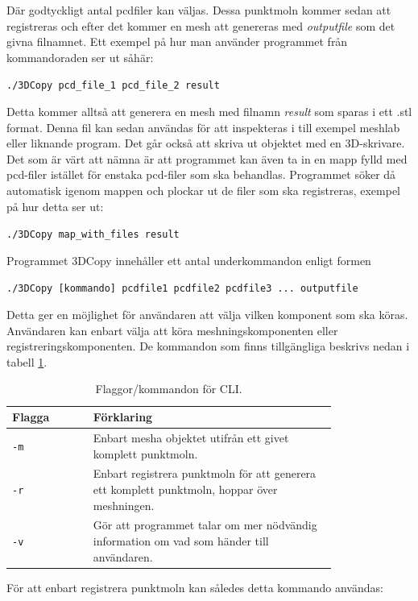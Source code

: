 \documentclass[a4paper,titlepage,12pt]{article}
\begin{document}
		Där godtyckligt antal pcdfiler kan väljas. Dessa punktmoln kommer sedan att registreras och efter det kommer en mesh att genereras med \textit{outputfile} som det givna filnamnet. Ett exempel på hur man använder programmet från kommandoraden ser ut såhär:
		
		\texttt{./3DCopy pcd\_file\_1 pcd\_file\_2 result}
		
		Detta kommer alltså att generera en mesh med filnamn \textit{result} som sparas i ett .stl format. Denna fil kan sedan användas för att inspekteras i till exempel meshlab eller liknande program. Det går också att skriva ut objektet med en 3D-skrivare. Det som är värt att nämna är att programmet kan även ta in en mapp fylld med pcd-filer istället för enstaka pcd-filer som ska behandlas. Programmet söker då automatisk igenom mappen och plockar ut de filer som ska registreras, exempel på hur detta ser ut:
		
		\texttt{./3DCopy map\_with\_files result}
		
		Programmet 3DCopy innehåller ett antal underkommandon enligt formen
		
		\texttt{./3DCopy [kommando] pcdfile1 pcdfile2 pcdfile3 ... outputfile}
		
		Detta ger en möjlighet för användaren att välja vilken komponent som ska köras. Användaren kan enbart välja att köra meshningskomponenten eller registreringskomponenten. De kommandon som finns tillgängliga beskrivs nedan i tabell \ref{tab:flaggor_cli}.
		
		\begin{table}[h!]
			\centering
			\caption{Flaggor/kommandon för CLI.}
			\label{tab:flaggor_cli}
			
			\begin{tabular}{p{0.2\linewidth}p{0.6\linewidth}}
				Flagga & Förklaring \\
				\hline
				\texttt{-m} & Enbart mesha objektet utifrån ett givet komplett punktmoln. \\
				\hline
				\texttt{-r} & Enbart registrera punktmoln för att generera ett komplett punktmoln, hoppar över meshningen. \\
				\hline
				\texttt{-v} & Gör att programmet talar om mer nödvändig information om vad som händer till användaren. \\
				\hline
			\end{tabular}
		\end{table}	
		
		För att enbart registrera punktmoln kan således detta kommando användas:
		
\end{document}
